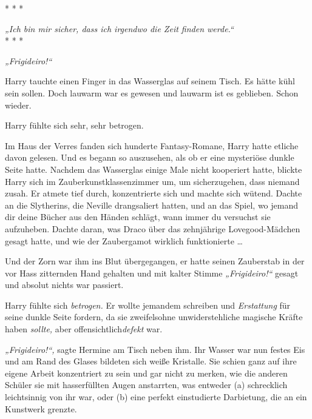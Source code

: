 

\hypertarget{gewissenhaftigkeit}{%

* * *

\hfill\break \emph{„Ich bin mir sicher, dass ich irgendwo die Zeit finden werde.“}\\

* * *

\emph{„Frigideiro!“}

Harry tauchte einen Finger in das Wasserglas auf seinem Tisch. Es hätte kühl sein sollen. Doch lauwarm war es gewesen und lauwarm ist es geblieben. Schon wieder.

Harry fühlte sich sehr, sehr betrogen.

Im Haus der Verres fanden sich hunderte Fantasy-Romane, Harry hatte etliche davon gelesen. Und es begann so auszusehen, als ob er eine mysteriöse dunkle Seite hatte. Nachdem das Wasserglas einige Male nicht kooperiert hatte, blickte Harry sich im Zauberkunstklassenzimmer um, um sicherzugehen, dass niemand zusah. Er atmete tief durch, konzentrierte sich und machte sich wütend. Dachte an die Slytherins, die Neville drangsaliert hatten, und an das Spiel, wo jemand dir deine Bücher aus den Händen schlägt, wann immer du versuchst sie aufzuheben. Dachte daran, was Draco über das zehnjährige Lovegood-Mädchen gesagt hatte, und wie der Zaubergamot wirklich funktionierte …

Und der Zorn war ihm ins Blut übergegangen, er hatte seinen Zauberstab in der vor Hass zitternden Hand gehalten und mit kalter Stimme \emph{„Frigideiro!“} gesagt und absolut nichts war passiert.

Harry fühlte sich \emph{betrogen.} Er wollte jemandem schreiben und \emph{Erstattung} für seine dunkle Seite fordern, da sie zweifelsohne unwiderstehliche magische Kräfte haben \emph{sollte,} aber offensichtlich\emph{defekt} war.

\emph{„Frigideiro!“,} sagte Hermine am Tisch neben ihm. Ihr Wasser war nun festes Eis und am Rand des Glases bildeten sich weiße Kristalle. Sie schien ganz auf ihre eigene Arbeit konzentriert zu sein und gar nicht zu merken, wie die anderen Schüler sie mit hasserfüllten Augen anstarrten, was entweder (a) schrecklich leichtsinnig von ihr war, oder (b) eine perfekt einstudierte Darbietung, die an ein Kunstwerk grenzte.

}
